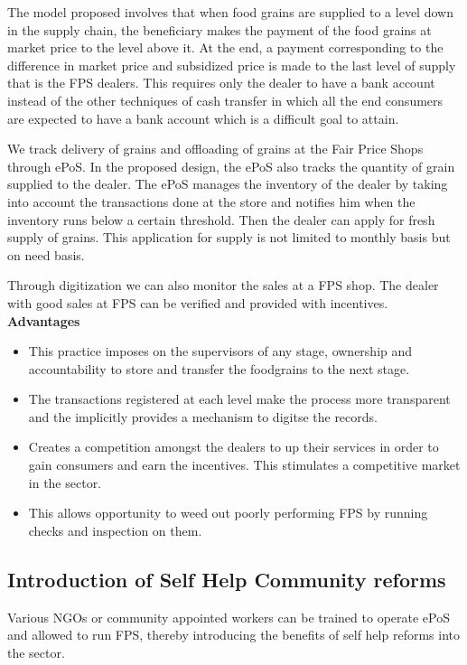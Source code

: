 \documentclass[a4paper,12pt,openany]{book}
\begin{document}
The model proposed involves that when food grains are supplied to a level down in the supply chain, the beneficiary makes the payment of the food grains at market price to the level above it. At the end, a payment corresponding to the difference in market price and subsidized price is made to the last level of supply that is the FPS dealers. This requires only the dealer to have a bank account instead of the other techniques of cash transfer in which all the end consumers are expected to have a bank account which is a difficult goal to attain.

We track delivery of grains and offloading of grains at the Fair Price Shops through ePoS.
In the proposed design, the ePoS also tracks the quantity of grain supplied to the dealer. The ePoS manages the inventory of the dealer by taking into account the transactions done at the store and notifies him when the inventory runs below a certain threshold. Then the dealer can apply for fresh supply of grains. This application for supply is not limited to monthly basis but on need basis.

Through digitization we can also monitor the sales at a FPS shop. The dealer with good sales at FPS can be verified and provided with incentives. \\

\textbf{Advantages}
\begin{itemize}
\item This practice imposes on the supervisors of any stage, ownership and accountability to store and transfer the foodgrains to the next stage.
\item The transactions registered at each level make the process more transparent and the implicitly provides a mechanism to digitse the records.
\item Creates a competition amongst the dealers to up their services in order to gain consumers and earn the incentives. This stimulates a competitive market in the sector. 
\item This allows opportunity to weed out poorly performing FPS by running checks and inspection on them.
\end{itemize}

\subsection{Introduction of Self Help Community reforms}
Various NGOs or community appointed workers can be trained to operate ePoS and allowed to run FPS, thereby introducing the benefits of self help reforms into the sector.
\end{document}
